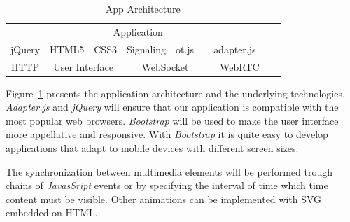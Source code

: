 \begin{table}[H]
\centering

    \begin{tabular}{cccccccc@{}m{0pt}@{}}
	\hline 
\multicolumn{8}{|c|}{\cellcolor{Gray}Application}  &\\[12pt]\cline{1-5}\cline{7-7}
\multicolumn{1}{|c|}{jQuery} & \multicolumn{1}{c|}{HTML5} & \multicolumn{1}{c|}{CSS3} & \multicolumn{1}{c|}{Signaling} & \multicolumn{1}{c|}{ot.js} & \multicolumn{1}{c|}{\cellcolor{Gray}} & \multicolumn{1}{c|}{adapter.js} &   \multicolumn{1}{c|}{\cellcolor{Gray}} &\\[12pt]\hline
\multicolumn{1}{|c|}{HTTP} & \multicolumn{2}{c|}{User Interface}  & \multicolumn{3}{c|}{WebSocket}    & \multicolumn{2}{c|}{WebRTC}      &\\[12pt]\hline
\end{tabular}
	\caption{App Architecture}
	        \label{fig:apparch}
\end{table}

Figure~\ref{fig:apparch} presents the application architecture and the underlying technologies. \emph{Adapter.js} and \emph{jQuery} will ensure that our application is compatible with the most popular web browsers.
\emph{Bootstrap} will be used to make the user interface more appellative and responsive. With \emph{Bootstrap} it is quite easy to develop applications that adapt to mobile devices with different screen sizes.

The synchronization between multimedia elements will be performed trough chains of \emph{JavasSript} events or by specifying the interval of time which time content must be visible. Other animations can be implemented with \ac{SVG} embedded on \ac{HTML}.
